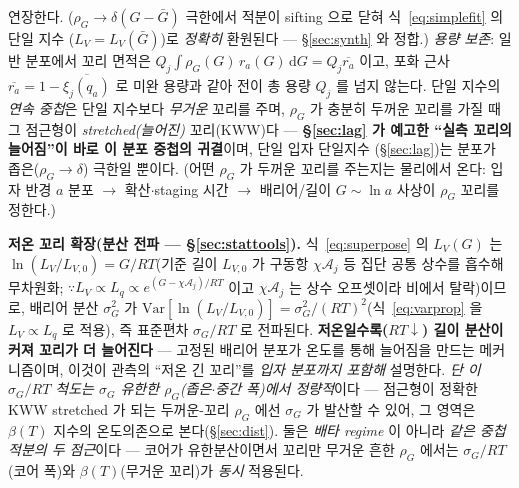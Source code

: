\documentclass[11pt,a4paper]{article}
\newcommand{\dd}{\mathrm{d}}
\begin{document}
연장한다. ($\rho_G\to\delta(G-\bar G)$ 극한에서 적분이 sifting 으로 닫혀 식~\eqref{eq:simplefit} 의 단일 지수
($L_V=L_V(\bar G)$)로 \emph{정확히} 환원된다 — \S\ref{sec:synth} 와 정합.) \emph{용량 보존}: 일반 분포에서 꼬리 면적은
$Q_j\!\int\!\rho_G(G)\,r_a(G)\,\dd G=Q_j\overline{r_a}$ 이고, 포화 근사 $\overline{r_a}=1-\overline{\xi_j(q_a)}$ 로 미완 용량과
같아 전이 총 용량 $Q_j$ 를 넘지 않는다. 단일 지수의 \emph{연속 중첩}은 단일 지수보다 \emph{무거운} 꼬리를 주며,
$\rho_G$ 가 충분히 두꺼운 꼬리를 가질 때 그 점근형이 \emph{stretched(늘어진)} 꼬리(KWW)다 \cite{lindsey1980,johnston2006,svare2000} —
\textbf{\S\ref{sec:lag} 가 예고한 ``실측 꼬리의 늘어짐''이 바로 이 분포 중첩의 귀결}이며, 단일 입자 단일지수
(\S\ref{sec:lag})는 분포가 좁은($\rho_G\to\delta$) 극한일 뿐이다. (어떤 $\rho_G$ 가 두꺼운 꼬리를 주는지는 물리에서
온다: 입자 반경 $a$ 분포 $\to$ 확산$\cdot$staging 시간 $\to$ 배리어/길이 $G\!\sim\!\ln a$ 사상이 $\rho_G$ 꼬리를 정한다.)

\textbf{저온 꼬리 확장(분산 전파 — \S\ref{sec:stattools}).} 식~\eqref{eq:superpose} 의 $L_V(G)$ 는 $\ln(L_V/L_{V,0})=G/RT$(기준 길이 $L_{V,0}$ 가 구동항 $\chi\mathcal A_j$ 등 집단 공통 상수를 흡수해 무차원화;
$\because L_V\propto L_q\propto e^{(G-\chi\mathcal A_j)/RT}$ 이고 $\chi\mathcal A_j$ 는 상수 오프셋이라 비에서 탈락)이므로, 배리어 분산 $\sigma_G^2$ 가 $\mathrm{Var}[\ln(L_V/L_{V,0})]=\sigma_G^2/(RT)^2$(식~\eqref{eq:varprop} 을 $L_V\propto L_q$ 로 적용), 즉
표준편차 $\sigma_G/RT$ 로 전파된다. \textbf{저온일수록($RT\downarrow$) 길이 분산이 커져 꼬리가 더 늘어진다} — 고정된
배리어 분포가 온도를 통해 늘어짐을 만드는 메커니즘이며, 이것이 관측의 ``저온 긴 꼬리''를 \emph{입자 분포까지
포함해} 설명한다. \emph{단 이 $\sigma_G/RT$ 척도는 $\sigma_G$ 유한한 $\rho_G$(좁은$\cdot$중간 폭)에서 정량적}이다 —
점근형이 정확한 KWW stretched 가 되는 두꺼운-꼬리 $\rho_G$ 에선 $\sigma_G$ 가 발산할 수 있어, 그 영역은 $\beta(T)$
지수의 온도의존으로 본다(\S\ref{sec:dist}). 둘은 \emph{배타 regime} 이 아니라 \emph{같은 중첩 적분의 두 점근}이다 —
코어가 유한분산이면서 꼬리만 무거운 흔한 $\rho_G$ 에서는 $\sigma_G/RT$(코어 폭)와 $\beta(T)$(무거운 꼬리)가 \emph{동시}
적용된다.
\end{document}

